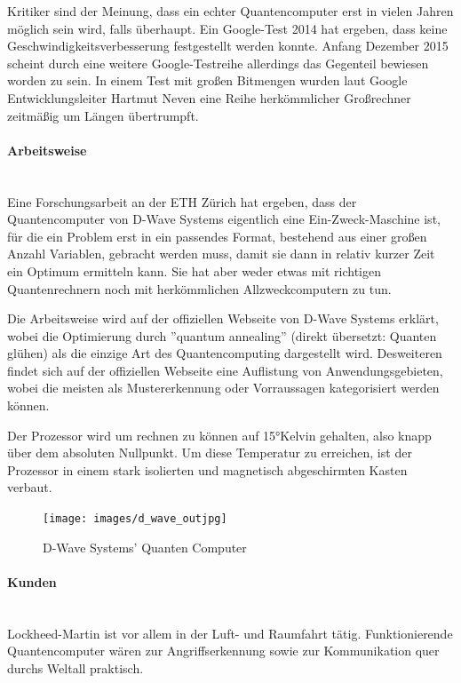 Kritiker sind der Meinung, dass ein echter Quantencomputer erst in vielen Jahren möglich sein wird, falls überhaupt. Ein Google-Test 2014 hat ergeben, dass keine Geschwindigkeitsverbesserung festgestellt werden konnte. Anfang Dezember 2015 scheint durch eine weitere Google-Testreihe allerdings das Gegenteil bewiesen worden zu sein. In einem Test mit großen Bitmengen wurden laut Google Entwicklungsleiter Hartmut Neven eine Reihe herkömmlicher Großrechner zeitmäßig um Längen übertrumpft. \cite{dwave1} \cite{dwave2}

\paragraph{Arbeitsweise} ~\\
Eine Forschungsarbeit an der ETH Zürich hat ergeben, dass der Quantencomputer von D-Wave Systems eigentlich eine Ein-Zweck-Maschine ist, für die ein Problem erst in ein passendes Format, bestehend aus einer großen Anzahl Variablen, gebracht werden muss, damit sie dann in relativ kurzer Zeit ein Optimum ermitteln kann. Sie hat aber weder etwas mit richtigen Quantenrechnern noch mit herkömmlichen Allzweckcomputern zu tun. \cite{dwave3} \cite{dwave4}

Die Arbeitsweise wird auf der offiziellen Webseite von D-Wave Systems erklärt, wobei die Optimierung durch ''quantum annealing'' (direkt übersetzt: Quanten glühen) als die einzige Art des Quantencomputing dargestellt wird. \cite{dwave5}
Desweiteren findet sich auf der offiziellen Webseite eine Auflistung von Anwendungsgebieten, wobei die meisten als Mustererkennung oder Vorraussagen kategorisiert werden können. \cite{dwave6}

Der Prozessor wird um rechnen zu können auf 15°Kelvin gehalten, also knapp über dem absoluten Nullpunkt. Um diese Temperatur zu erreichen, ist der Prozessor in einem stark isolierten und magnetisch abgeschirmten Kasten verbaut.

\begin{figure}[!htb]
	\centering\texttt{[image: images/d\_wave\_outjpg]}
	\caption{D-Wave Systems' Quanten Computer}
	\label{dwave2}
\end{figure}

\paragraph{Kunden} ~\\

Lockheed-Martin ist vor allem in der Luft- und Raumfahrt tätig. Funktionierende Quantencomputer wären zur Angriffserkennung sowie zur Kommunikation quer durchs Weltall praktisch.

